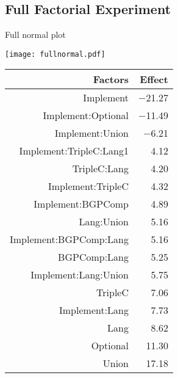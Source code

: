 \documentclass[english,usenames,dvipsnames,aspectratio=169]{beamer}
\begin{document}

\subsection{Full Factorial Experiment}

\begin{frame}{Full normal plot}
  \begin{minipage}{0.49\textwidth}
    \texttt{[image: fullnormal.pdf]}
  \end{minipage}
  \begin{minipage}{0.49\textwidth}\small
    \vspace{-2ex}\qquad
    \begin{tabular}{rr}
      \hline
      \textbf{Factors} & \textbf{Effect}  \\ 
      \hline
      Implement & $-$21.27 \\ 
      Implement:Optional & $-$11.49 \\ 
      Implement:Union & $-$6.21 \\ 
      Implement:TripleC:Lang1 & 4.12 \\ 
      TripleC:Lang & 4.20 \\ 
      Implement:TripleC & 4.32 \\ 
      Implement:BGPComp & 4.89 \\ 
      Lang:Union & 5.16 \\ 
      Implement:BGPComp:Lang & 5.16 \\ 
      BGPComp:Lang & 5.25 \\ 
      Implement:Lang:Union & 5.75 \\ 
      TripleC & 7.06 \\ 
      Implement:Lang & 7.73 \\ 
      Lang & 8.62 \\ 
      Optional & 11.30 \\ 
      Union & 17.18 \\ 
      \hline
    \end{tabular}
  \end{minipage}
\end{frame}
\end{document}
